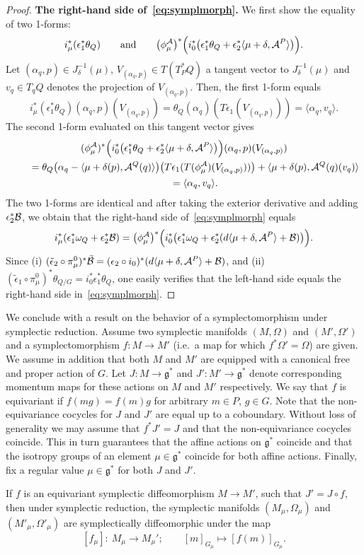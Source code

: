 \documentclass[pdftex]{sigma}
\newcommand{\A}{{\cal A}}
\newcommand{\B}{{\cal B}}
\newcommand{\e}{\epsilon}
\newcommand{\lag}{\mathfrak{g}}
\begin{document}
\begin{proof}
{\bf The right-hand side of~\eqref{eq:symplmorph}.}
We f\/irst show the equality of two 1-forms:
\[
i^*_\mu(\e_1^*\theta_Q)\qquad \mbox{and} \qquad \big(\phi_\mu^\A\big)^*\Big(i^*_0\big(\e_1^*\theta_Q +\e_2^*\langle \mu+\delta,\A^P\rangle\big)\Big).
\] Let $(\alpha_q,p)\in J^{-1}_\delta(\mu)$, $V_{(\alpha_q,p)}\in T( T_P^*Q)$ a tangent vector to $J^{-1}_\delta(\mu)$ and $v_q\in T_qQ$ denotes the projection of $V_{(\alpha_q,p)}$. Then, the f\/irst 1-form equals
\[
i^*_\mu(\e_1^*\theta_Q)(\alpha_q,p)(V_{(\alpha_q,p)})= \theta_Q(\alpha_q)(T\e_1(V_{(\alpha_q,p)}))=\langle \alpha_q, v_q\rangle.
\]
The second 1-form evaluated on this tangent vector gives
\begin{gather*}
   (\phi_\mu^\A)^*\Big(i^*_0\big(\e_1^*\theta_Q +\e_2^*\langle\mu+\delta,\A^P\rangle\big)\Big)(\alpha_q,p)(V_{(\alpha_q,p)}) \\
    \qquad{}  = \theta_Q\big(\alpha_q-\langle\mu+\delta(p),\A^Q(q)\rangle\big)\big(T\e_1(T(\phi^\A_\mu)(V_{(\alpha_q,p)}))\big)  + \langle \mu+\delta(p),\A^Q(q)(v_q)\rangle\\
{} \qquad = \langle \alpha_q, v_q\rangle.
\end{gather*}
The two 1-forms are identical and after taking the exterior derivative and adding $\e^*_2\B$, we obtain that the right-hand side of~\eqref{eq:symplmorph} equals \[i^*_\mu(\e_1^*\omega_Q+\e^*_2\B) = \big(\phi_\mu^{\A}\big)^*\Big(i^*_0\big(\e_1^*\omega_Q +\e_2^*(d\langle \mu+\delta,\A^P\rangle+\B)\big)\Big).\]
Since (i) $(\tilde\e_2\circ\pi^0_\mu)^*\tilde\B = (\e_2\circ i_0)^*(d\langle \mu+\delta,\A^P\rangle+\B)$, and (ii) $(\tilde\e_1\circ\pi^0_\mu)^*\theta_{Q/G}=i_0^*\e_1^*\theta_{Q}$, one easily verif\/ies that the left-hand side equals the right-hand side in~\eqref{eq:symplmorph}.
\end{proof}

We conclude with a result on the behavior of a symplectomorphism under symplectic reduction. Assume two symplectic manifolds $(M,\Omega)$ and $(M',\Omega')$ and a symplectomorphism $f:M\to M'$ (i.e.\ a map for which $f^*\Omega'=\Omega$) are given. We assume in addition that both $M$ and $M'$ are equipped with a canonical free and proper action of $G$. Let $J:M\to \lag^*$ and $J':M'\to \lag^*$ denote corresponding momentum maps for these actions on $M$ and $M'$ respectively. We say that $f$ is equivariant if $f(mg)=f(m)g$ for arbitrary $m\in P$, $g\in G$. Note that the non-equivariance cocycles for $J$ and $J'$ are equal up to a coboundary. Without loss of generality we may assume that $f^*J'=J$ and that the non-equivariance cocycles coincide. This in turn guarantees that the af\/f\/ine actions on $\lag^*$ coincide and that the isotropy groups of an element $\mu\in\lag^*$ coincide for both af\/f\/ine actions. Finally, f\/ix  a regular value $\mu \in \lag^*$ for both $J$ and $J'$.
\begin{theorem}\label{thm:1}
  If $f$ is an equivariant symplectic diffeomorphism $M\to M'$, such that $J'=J \circ f$, then under symplectic reduction, the symplectic manifolds $(M_\mu,\Omega_\mu)$ and $(M'_\mu,\Omega'_\mu)$ are symplectically diffeomorphic under the map
  \[
  [f_\mu]:\ M_\mu\to M_\mu'; \qquad [m]_{G_\mu} \mapsto [f(m)]_{G_\mu}.
  \]
\end{theorem}
\end{document}
